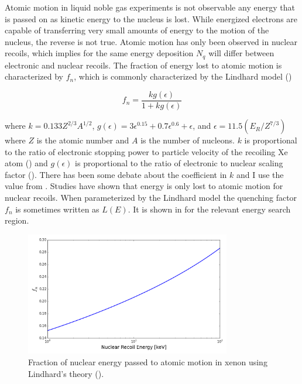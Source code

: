 \noindent Atomic motion in liquid noble gas experiments is not observable any energy that is passed on as kinetic energy to the nucleus
is lost.  While energized electrons are capable of transferring very small
amounts of energy to the motion of the nucleus, the reverse is not true.  Atomic motion has only been observed in nuclear recoils,
which implies for the same energy deposition $N_{q}$ will differ between electronic and nuclear recoils.  The fraction of energy lost
to atomic motion is characterized by $f_{n}$, which is commonly characterized by the Lindhard model
()

\begin{equation}
f_{n} = \frac{k g(\epsilon)}{1 + k g(\epsilon)}
\label{eq:linhard_quenching}
\end{equation}

\noindent where $k = 0.133Z^{2/3}A^{1/2}$, $g(\epsilon) = 3\epsilon^{0.15} + 0.7\epsilon^{0.6} + \epsilon$, and
$\epsilon = 11.5 (E_{R} / Z^{7/3})$ where $Z$ is the atomic number and $A$ is the number of nucleons.  $k$ is proportional to the ratio of
electronic stopping power to particle velocity of the recoiling Xe atom () and $g(\epsilon)$ is proportional
to the ratio of electronic to nuclear scaling factor ().  There has been some debate about
the coefficient in $k$ and I use the value from .  Studies have shown that energy is only lost to atomic motion for
nuclear recoils.  When parameterized by the Lindhard model the quenching factor $f_{n}$ is sometimes written as $L(E)$.  It is
shown in  for the relevant energy search region.

\begin{figure}
\includegraphics[width=0.8\textwidth]{Lindhard}
\caption{Fraction of nuclear energy passed to atomic motion in xenon using Lindhard's theory ().}
\label{fig:lindhard}
\end{figure}

